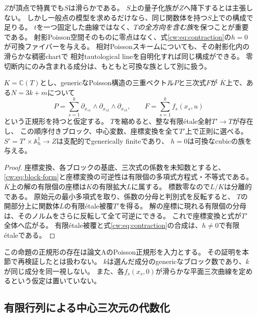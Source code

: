 \begin{remark}[頂点での降下はgenericな目標には不要]
\label{cw:rem:no-cone-descent}
$Z$が頂点で特異でも$S$は滑らかである。
$S$上の量子化族が$Z$へ降下するとは主張しない。
しかし一般点の模型を求めるだけなら、同じ関数体を持つ$S$上での構成で足りる。
$t$を一つ固定した曲線ではなく、\emph{$T$の全方向を含む族}を保つことが重要である。
射影Poisson空間そのものに零点はなく、式\eqref{cw:eq:contraction}の$h=0$が可換ファイバーを与える。
相対Poissonスキームについても、その射影化内の滑らかな稠密chartで
相対tautological lineを自明化すれば同じ構成ができる。
零切断内にのみ含まれる成分は、もともと可換な族として別に扱う。
\end{remark}

\begin{proposition}[ブロック正規形の有限被覆上の固定]
\label{cw:prop:normal-form-cover}
$K=\mathbb C(T)$とし、genericなPoisson構造の三重ベクトル$P$と三次式$F$が
$\overline K$上で、ある$N=3k+m$について
\[
 P=\sum_{s=1}^k\partial_{x_{s1}}\wedge\partial_{x_{s2}}\wedge\partial_{x_{s3}},
 \qquad F=\sum_{s=1}^k f_s(x_s,u)
 \tag{B}\label{cw:eq:block-form}
\]
という正規形を持つと仮定する。
$T$を縮めると、整な有限étale全射$T'\to T$が存在し、
この順序付きブロック、中心変数、座標変換を全て$T'$上で正則に選べる。
$S'=T'\times\mathbb A^1_h\to Z$は支配的でgenerically finiteであり、
$h=0$は可換なcubicの族を与える。
\end{proposition}
\begin{proof}
座標変換、各ブロックの基底、三次式の係数を未知数とすると、
\eqref{cw:eq:block-form}と座標変換の可逆性は有限個の多項式方程式・不等式である。
$\overline K$上の解の有限個の座標は$K$の有限拡大$L$に属する。
標数零なので$L/K$は分離的である。
原始元の最小多項式を取り、係数の分母と判別式を反転すると、
$T$の開部分上に関数体$L$の有限étale被覆$T'$を得る。
解の座標に現れる有限個の分母は、そのノルムをさらに反転して全て可逆にできる。
これで座標変換と式が$T'$全体へ広がる。
有限étale被覆と式\eqref{cw:eq:contraction}の合成は、$h\ne0$で有限étaleである。
\end{proof}
\begin{remark}
この命題の正規形の存在は論文AのPoisson正規形を入力とする。
その証明を本節で再検証したとは扱わない。
$k$は選んだ成分のgenericなブロック数であり、$k$が同じ成分を同一視しない。
また、各$f_s(x_s,0)$が滑らかな平面三次曲線を定めるという仮定は置いていない。
\end{remark}

\subsection{有限行列による中心三次元の代数化}

